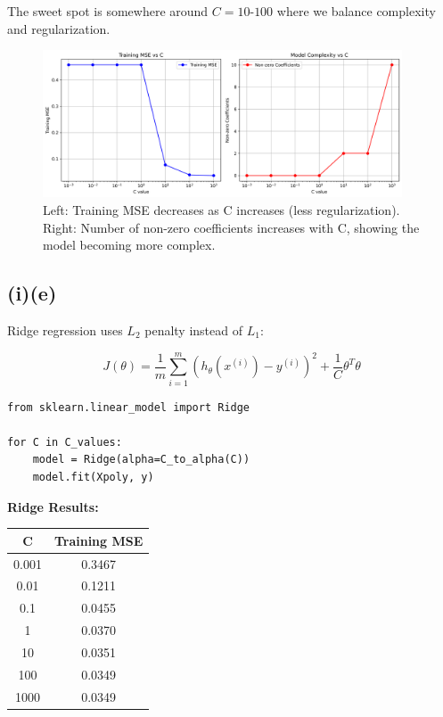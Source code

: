 \documentclass[11pt,a4paper]{article}
\begin{document}
The sweet spot is somewhere around $C = 10$-$100$ where we balance complexity and regularization.

\begin{figure}[H]
\centering
\includegraphics[width=0.95\textwidth]{figures/04_underfitting_overfitting_analysis.png}
\caption{Left: Training MSE decreases as C increases (less regularization). Right: Number of non-zero coefficients increases with C, showing the model becoming more complex.}
\label{fig:underfitting_overfitting}
\end{figure}

\subsection*{(i)(e)}

Ridge regression uses $L_2$ penalty instead of $L_1$:

\begin{equation}
J(\theta) = \frac{1}{m} \sum_{i=1}^{m} (h_\theta(x^{(i)}) - y^{(i)})^2 + \frac{1}{C} \theta^T\theta
\end{equation}

\begin{lstlisting}
from sklearn.linear_model import Ridge

for C in C_values:
    model = Ridge(alpha=C_to_alpha(C))
    model.fit(Xpoly, y)
\end{lstlisting}

\textbf{Ridge Results:}

\begin{table}[H]
\centering
\begin{tabular}{cc}
\toprule
C & Training MSE \\
\midrule
0.001 & 0.3467 \\
0.01 & 0.1211 \\
0.1 & 0.0455 \\
1 & 0.0370 \\
10 & 0.0351 \\
100 & 0.0349 \\
1000 & 0.0349 \\
\bottomrule
\end{tabular}
\end{table}
\end{document}
